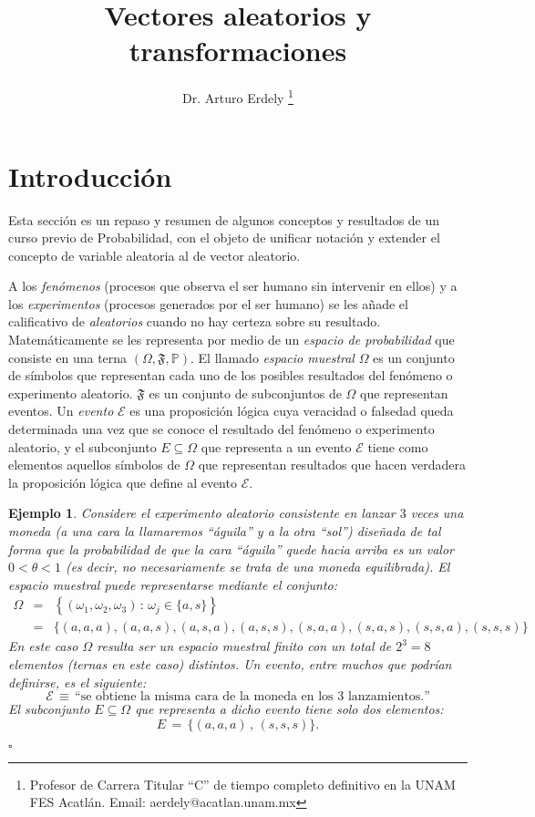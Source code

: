 \documentclass[spanish,10pt,letterpaper]{article}
\title{Vectores aleatorios y transformaciones}
\author{Dr. Arturo Erdely \thanks{Profesor de Carrera Titular ``C'' de tiempo completo definitivo en la UNAM FES Acatlán. Email: aerdely@acatlan.unam.mx}}
\date{}
\newtheorem{ejem}{Ejemplo}
\newcommand{\prob}{\mathbb{P}}
\newcommand{\qed}{\begin{flushright}$\square$\end{flushright}}
\begin{document}
	
	\maketitle
	
	
	
	\section*{Introducción}\label{sec:intro}
	
	Esta sección es un repaso y resumen de algunos conceptos y resultados de un curso previo de Probabilidad, con el objeto de unificar notación y extender el concepto de variable aleatoria al de vector aleatorio.
	
	\medskip 
	
	A los \textit{fenómenos} (procesos que observa el ser humano sin intervenir en ellos) y a los \textit{experimentos} (procesos generados por el ser humano) se les añade el calificativo de \textit{aleatorios} cuando no hay certeza sobre su resultado. Matemáticamente se les representa por medio de un \textit{espacio de probabilidad} que consiste en una terna $(\Omega, \mathfrak{F}, \prob).$ El llamado \textit{espacio muestral} $\Omega$ es un conjunto de símbolos que representan cada uno de los posibles resultados del fenómeno o experimento aleatorio. $\mathfrak{F}$ es un conjunto de subconjuntos de $\Omega$ que representan eventos. Un \textit{evento} $\mathcal{E}$ es una proposición lógica cuya veracidad o falsedad queda determinada una vez que se conoce el resultado del fenómeno o experimento aleatorio, y el subconjunto $E\subseteq\Omega$ que representa a un evento $\mathcal{E}$ tiene como elementos aquellos símbolos de $\Omega$ que representan resultados que hacen verdadera la proposición lógica que define al evento $\mathcal{E}.$
	
	\bigskip 
	
	\begin{ejem}\label{ej:moneda3veces}
		Considere el experimento aleatorio consistente en lanzar $3$ veces una moneda (a una cara la llamaremos ``águila'' y a la otra ``sol'') diseñada de tal forma que la probabilidad de que la cara ``águila'' quede hacia arriba es un valor $0<\theta<1$ (es decir, no necesariamente se trata de una moneda equilibrada). El espacio muestral puede representarse mediante el conjunto: 
		\begin{eqnarray*}
			\Omega &=& \left\{(\omega_1,\omega_2,\omega_3)\,:\,\omega_j\in\{a,s\}\right\} \\
			&=& \{(a,a,a),(a,a,s),(a,s,a),(a,s,s),(s,a,a),(s,a,s),(s,s,a),(s,s,s)\}
		\end{eqnarray*}		
		En este caso $\Omega$ resulta ser un espacio muestral finito con un total de $2^3=8$ elementos (ternas en este caso) distintos. Un evento, entre muchos que podrían definirse, es el siguiente: $$\mathcal{E} \,\equiv\, \text{``se obtiene la misma cara de la moneda en los $3$ lanzamientos.''}$$
		El subconjunto $E\subseteq\Omega$ que representa a dicho evento tiene solo dos elementos: $$E\,=\,\{(a,a,a)\,,\,(s,s,s)\}.$$ \qed 
	\end{ejem}
	
\end{document}
